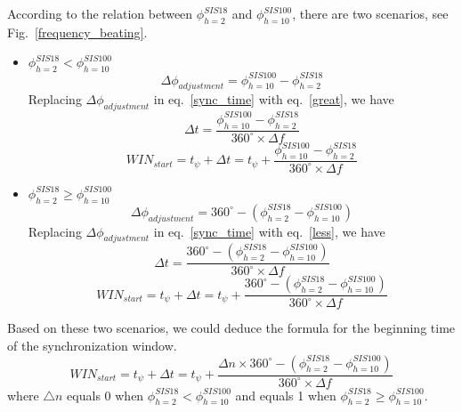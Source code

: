 According to the relation between $\phi_{h=2}^{SIS18}$ and $\phi_{h=10}^{SIS100}$, there are two scenarios, see Fig.~\ref{frequency_beating}.
\begin{itemize}
    \item $\phi_{h=2}^{SIS18} < \phi_{h=10}^{SIS100}$
	\begin{equation}
	 \Delta \phi_{adjustment} = \phi_{h=10}^{SIS100} - \phi_{h=2}^{SIS18}\label {great}
   \end{equation}
   Replacing $\Delta \phi_{adjustment}$ in eq.~\ref{sync_time} with eq.~\ref{great}, we have
	\begin{equation}
	 \Delta t = \frac {\phi_{h=10}^{SIS100} - \phi_{h=2}^{SIS18}}{{360^\circ} \times {\Delta f}} \label {beating_time}
   \end{equation}
	\begin{equation}
	 WIN_{start} = t_{\psi} + \Delta t =t_{\psi} +\frac {\phi_{h=10}^{SIS100} - \phi_{h=2}^{SIS18}}{{360^\circ} \times {\Delta f}} \label {beating_win_1}
   \end{equation}
     \item  $\phi_{h=2}^{SIS18} \ge \phi_{h=10}^{SIS100}$
	\begin{equation}
	 \Delta \phi_{adjustment} = 360^\circ - (\phi_{h=2}^{SIS18}-\phi_{h=10}^{SIS100}) \label {less}
   \end{equation}
  Replacing $\Delta \phi_{adjustment}$ in eq.~\ref{sync_time} with eq.~\ref{less}, we have
	\begin{equation}
	 \Delta t = \frac {360^\circ - (\phi_{h=2}^{SIS18}-\phi_{h=10}^{SIS100})}{{360^\circ} \times {\Delta f}} \label {beating_time}
   \end{equation}
	\begin{equation}
	 WIN_{start} = t_{\psi} + \Delta t =t_{\psi} +\frac {360^\circ - (\phi_{h=2}^{SIS18}-\phi_{h=10}^{SIS100})}{{360^\circ} \times {\Delta f}} \label {beating_win_2}
   \end{equation}
\end{itemize}
Based on these two scenarios, we could deduce the formula for the beginning time of the synchronization window. 
	\begin{equation}
	 WIN_{start} = t_{\psi}+ \Delta t =t_{\psi} +\frac {{\Delta n} \times {360^\circ} - (\phi_{h=2}^{SIS18}-\phi_{h=10}^{SIS100})}{{360^\circ} \times {\Delta f}} \label {beating_win_2}
   \end{equation}
where $\bigtriangleup{n}$ equals 0 when  $\phi_{h=2}^{SIS18} < \phi_{h=10}^{SIS100}$ and equals 1 when  $\phi_{h=2}^{SIS18} \ge \phi_{h=10}^{SIS100}$.

